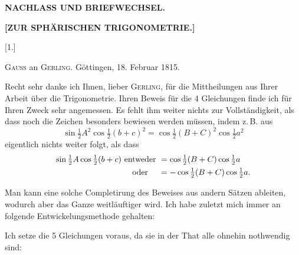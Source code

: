 \begin{center}
\textbf{NACHLASS UND BRIEFWECHSEL.}

\vspace{1em}

\textbf{[ZUR SPHÄRISCHEN TRIGONOMETRIE.]}

\vspace{0.5em}

\end{center}

\vspace{1em}

\begin{center}[1.]\end{center}

\begin{center}
\textsc{Gauss} an \textsc{Gerling}. Göttingen, 18. Februar 1815.
\end{center}

Recht sehr danke ich Ihnen, lieber \textsc{Gerling}, für die Mittheilungen aus
Ihrer Arbeit über die Trigonometrie. Ihren Beweis für die 4 Gleichungen finde
ich für Ihren Zweck sehr angemessen. Es fehlt ihm weiter nichts zur
Vollständigkeit, als dass noch die Zeichen besonders bewiesen werden müssen,
indem z.\,B. aus
\[
\sin \tfrac12 A^2 \cos \tfrac12 (b+c)^2 = \cos \tfrac12 (B+C)^2 \cos \tfrac12 a^2
\]
eigentlich nichts weiter folgt, als dass
\[
\begin{array}{r@{\ }c@{\ }l}
\sin \tfrac12 A \cos \tfrac12 (b+c) & \text{entweder} & {}=\cos \tfrac12 (B+C) \cos \tfrac12 a \\[4pt]
 & \text{oder} & {}=-\cos \tfrac12 (B+C) \cos \tfrac12 a.
\end{array}
\]

Man kann eine solche Completirung des Beweises aus andern Sätzen ableiten,
wodurch aber das Ganze weitläuftiger wird. Ich habe zuletzt mich immer an
folgende Entwickelungsmethode gehalten:

Ich setze die 5 Gleichungen voraus, da sie in der That alle ohnehin
nothwendig sind:
